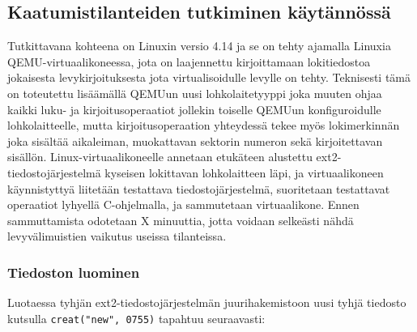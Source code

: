 \subsection{Kaatumistilanteiden tutkiminen käytännössä}

Tutkittavana kohteena on Linuxin versio 4.14 ja se on tehty ajamalla Linuxia QEMU-virtuaalikoneessa,
jota on laajennettu kirjoittamaan lokitiedostoa jokaisesta levykirjoituksesta jota virtualisoidulle levylle on tehty.
Teknisesti tämä on toteutettu lisäämällä QEMUun uusi lohkolaitetyyppi joka muuten ohjaa kaikki luku- ja kirjoitusoperaatiot jollekin toiselle QEMUun konfiguroidulle lohkolaitteelle,
mutta kirjoitusoperaation yhteydessä tekee myös lokimerkinnän joka sisältää aikaleiman, muokattavan sektorin numeron sekä kirjoitettavan sisällön.
Linux-virtuaalikoneelle annetaan etukäteen alustettu ext2-tiedostojärjestelmä kyseisen lokittavan lohkolaitteen läpi,
ja virtuaalikoneen käynnistyttyä liitetään testattava tiedostojärjestelmä,
suoritetaan testattavat operaatiot lyhyellä C-ohjelmalla,
ja sammutetaan virtuaalikone.
Ennen sammuttamista odotetaan X minuuttia,
jotta voidaan selkeästi nähdä levyvälimuistien vaikutus useissa tilanteissa.

\subsubsection{Tiedoston luominen}
\label{ChapExt2FileCreation}
Luotaessa tyhjän ext2-tiedostojärjestelmän juurihakemistoon uusi tyhjä tiedosto kutsulla \texttt{creat("new", 0755)} tapahtuu seuraavasti:

